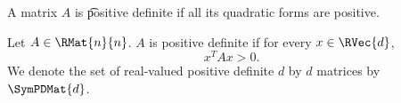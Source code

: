 


A matrix $A$ is \t{positive definite} if all its quadratic forms are positive.


Let $A \in \RMat{n}{n}$.
$A$ is positive definite if for every $x \in \RVec{d}$,
$$
  x^T A x > 0.
$$
We denote the set of real-valued positive definite $d$ by $d$
matrices by $\SymPDMat{d}$.

